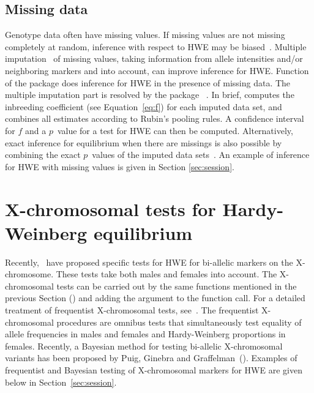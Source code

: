 \documentclass[nojss]{jss}
\begin{document}

\subsection{Missing data}
\label{subsec:missing}

Genotype data often have missing values. If missing values are not
missing completely at random, inference with respect to HWE may be
biased~\citep{Graffel24}. Multiple imputation~\citep{Little2} of
missing values, taking information from allele intensities and/or
neighboring markers and into account, can improve inference for
HWE. Function  of the package does inference for HWE
in the presence of missing data. The multiple imputation part is
resolved by the package ~\citep{Buuren}. In brief,
 computes the inbreeding coefficient (see
Equation~\ref{eq:f}) for each imputed data set, and combines all
estimates according to Rubin's pooling rules. A confidence interval
for $f$ and a $p$~value for a test for HWE can then be computed. 
Alternatively, exact inference for equilibrium when there are missings is 
also possible by combining the exact $p$~values of the imputed data sets~\citep{Graffel27}.
An example of inference for HWE with missing values is given in Section \ref{sec:session}.

\section{X-chromosomal tests for Hardy-Weinberg equilibrium}
\label{sec:xchrom}

Recently,~\citet{Graffel28} have proposed specific tests for HWE for bi-allelic 
markers on the X-chromosome. These tests take both males and females into account. The X-chromosomal tests
can be carried out by the same functions mentioned in the previous Section () and adding
the argument  to the function call. For a detailed treatment of frequentist X-chromosomal 
tests, see~\citet{Graffel28}. The frequentist X-chromosomal procedures are omnibus tests that simultaneously 
test equality of allele frequencies in males and females and Hardy-Weinberg proportions in females. Recently, a
Bayesian method for testing bi-allelic X-chromosomal variants has been proposed by Puig, Ginebra and 
Graffelman~(\citeyear{Puig}). Examples of frequentist and Bayesian testing of X-chromosomal markers for HWE are given 
below in Section~\ref{sec:session}.
\end{document}
